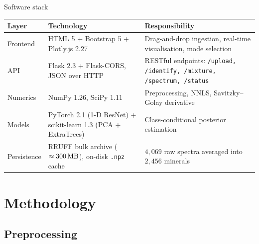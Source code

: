 \documentclass[10pt,aspectratio=169,xcolor=dvipsnames]{beamer}
\newcommand{\code}[1]{\texttt{\small #1}}
\begin{document}
\begin{frame}{Software stack}
  \begin{table}\centering\small
    \begin{tabular}{@{}p{}p{}p{}@{}}
      \toprule
      \textbf{Layer} & \textbf{Technology} & \textbf{Responsibility} \\
      \midrule
      Frontend  & HTML 5 + Bootstrap 5 + Plotly.js 2.27 &
                  Drag-and-drop ingestion, real-time visualisation, mode selection \\
      API       & Flask 2.3 + Flask-CORS, JSON over HTTP &
                  RESTful endpoints: \code{/upload, /identify, /mixture, /spectrum, /status} \\
      Numerics  & NumPy 1.26, SciPy 1.11 &
                  Preprocessing, NNLS, Savitzky–Golay derivative \\
      Models    & PyTorch 2.1 (1-D ResNet) +
                  scikit-learn 1.3 (PCA $+$ ExtraTrees) &
                  Class-conditional posterior estimation \\
      Persistence & RRUFF bulk archive ($\approx \SI{300}{\mega\byte}$),
                    on-disk \code{.npz} cache &
                  $4{,}069$ raw spectra averaged into $2{,}456$ minerals \\
      \bottomrule
    \end{tabular}
  \end{table}
\end{frame}

\section{Methodology}

\subsection{Preprocessing}
\end{document}

